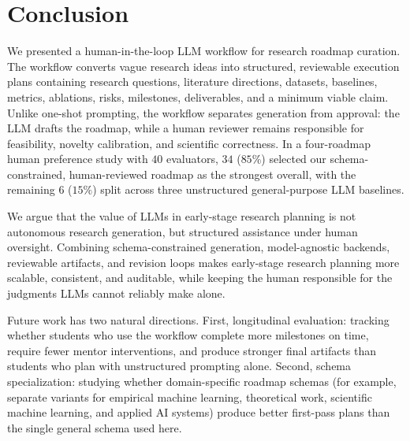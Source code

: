 \documentclass[11pt]{article}
\begin{document}
\section{Conclusion}
\label{sec:conclusion}

We presented a human-in-the-loop LLM workflow for research roadmap curation. The workflow converts vague research ideas into structured, reviewable execution plans containing research questions, literature directions, datasets, baselines, metrics, ablations, risks, milestones, deliverables, and a minimum viable claim. Unlike one-shot prompting, the workflow separates generation from approval: the LLM drafts the roadmap, while a human reviewer remains responsible for feasibility, novelty calibration, and scientific correctness. In a four-roadmap human preference study with $40$ evaluators, $34$ ($85\%$) selected our schema-constrained, human-reviewed roadmap as the strongest overall, with the remaining $6$ ($15\%$) split across three unstructured general-purpose LLM baselines.

We argue that the value of LLMs in early-stage research planning is not autonomous research generation, but structured assistance under human oversight. Combining schema-constrained generation, model-agnostic backends, reviewable artifacts, and revision loops makes early-stage research planning more scalable, consistent, and auditable, while keeping the human responsible for the judgments LLMs cannot reliably make alone.

Future work has two natural directions. First, longitudinal evaluation: tracking whether students who use the workflow complete more milestones on time, require fewer mentor interventions, and produce stronger final artifacts than students who plan with unstructured prompting alone. Second, schema specialization: studying whether domain-specific roadmap schemas (for example, separate variants for empirical machine learning, theoretical work, scientific machine learning, and applied AI systems) produce better first-pass plans than the single general schema used here.



\FloatBarrier


\end{document}
